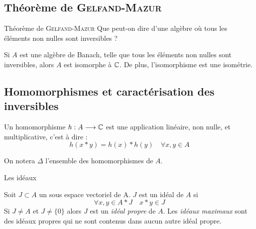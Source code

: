 \documentclass[11pt, xcolor=table]{beamer}
\begin{document}
\subsection{Théorème de \textsc{Gelfand}-\textsc{Mazur}}

\begin{frame}{Théorème de \textsc{Gelfand}-\textsc{Mazur}}
    Que peut-on dire d'une algèbre où tous les éléments non nulles sont inversibles ?

    \begin{myth}
        Si $A$ est une algèbre de Banach, telle que tous les éléments non nulles sont inversibles, alors $A$ est isomorphe à
        $\mathbb{C}$. De plus, l'isomorphisme est une isométrie.  
    \end{myth}
\end{frame}

\subsection{Homomorphismes et caractérisation des inversibles}

\begin{frame}
    \begin{mydef}[Homomorphisme]
        Un homomorphisme $h : A \longrightarrow \mathbb{C}$ est une application linéaire, non nulle, et multiplicative, c'est à dire :
        \[
            h(x*y) = h(x)*h(y) \quad \forall x,y \in A
        \]
    \end{mydef}

    \begin{mydef}
        On notera $\Delta$ l'ensemble des homomorphismes de $A$.
    \end{mydef} 
\end{frame}

\begin{frame}{Les idéaux}
    \begin{mydef}[Idéal]
        Soit $J \subset A$ un sous espace vectoriel de A. $J$ est un idéal de $A$ si 
        \[
            \forall x, y \in A*J \quad x*y \in J
        \] 
        Si $J \not = A$ et $J \not = \{0\}$ alors $J$ est un \emph{idéal propre} de $A$. Les \emph{idéaux maximaux} sont des idéaux propres qui ne sont
        contenus dans aucun autre idéal propre.
    \end{mydef}
\end{frame}
\end{document}
